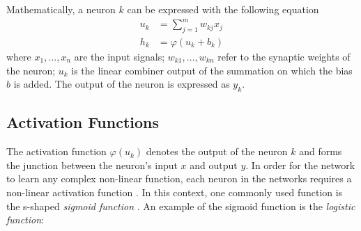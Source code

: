 \begin{figure}[h]
	\centering
\end{figure}

Mathematically, a neuron $k$ can be expressed with the following equation \cite{Haykin:1998:NNC:521706}
\begin{eqnarray}
  u_k &= \sum_{j = 1}^{m}w_{kj}x_{j} \\
  h_k &= \varphi(u_k + b_k)
\end{eqnarray}
where $x_1, \dots, x_n$ are the input signals; $w_{k1}, \dots, w_{kn}$ refer to the synaptic weights of the neuron; $u_k$ is the linear combiner output of the summation on which the bias $b$ is added. The output of the neuron is expressed as $y_k$.

\subsection{Activation Functions}
The activation function $\varphi(u_k)$ denotes the output of the neuron $k$ and forms the junction between the neuron's input $x$ and output $y$. In order for the network to learn any complex non-linear function, each neuron in the networks requires a non-linear activation function \cite{Goodfellow-et-al-2016}. In this context, one commonly used function is the s-shaped \textit{sigmoid function} \cite{Haykin:1998:NNC:521706}. An example of the sigmoid function is the \textit{logistic function}:\\


